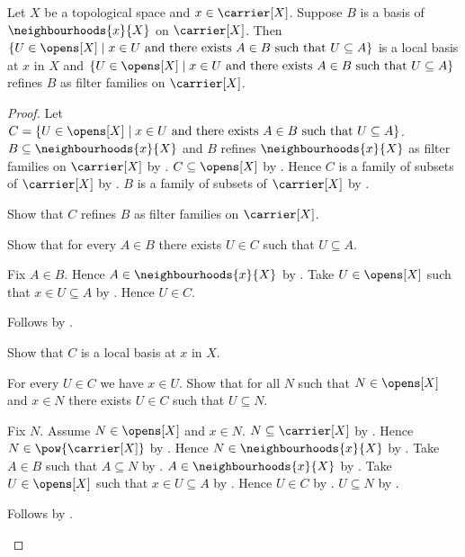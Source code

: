 \begin{theorem}\label{neighbourhood_filter_basis_has_open_local_refinement}
    Let $X$ be a topological space and $x\in\carrier[X]$.
    Suppose $B$ is a basis of $\neighbourhoods{x}{X}$ on $\carrier[X]$.
    Then
        $\{U\in\opens[X]\mid
            \text{$x\in U$ and there exists $A\in B$ such that
                $U\subseteq A$}\}$
            is a local basis at $x$ in $X$ and
        $\{U\in\opens[X]\mid
            \text{$x\in U$ and there exists $A\in B$ such that
                $U\subseteq A$}\}$
            refines $B$ as filter families on $\carrier[X]$.
\end{theorem}
\begin{proof}
    Let $C=\{U\in\opens[X]\mid
        \text{$x\in U$ and there exists $A\in B$ such that
            $U\subseteq A$}\}$.
    $B\subseteq\neighbourhoods{x}{X}$ and
        $B$ refines $\neighbourhoods{x}{X}$
            as filter families on $\carrier[X]$
        by .
    $C\subseteq\opens[X]$ by .
    Hence $C$ is a family of subsets of $\carrier[X]$
        by .
    $B$ is a family of subsets of $\carrier[X]$
        by .

    Show that $C$ refines $B$ as filter families on $\carrier[X]$.
    \begin{subproof}
        Show that for every $A\in B$ there exists $U\in C$ such that
            $U\subseteq A$.
        \begin{subproof}
            Fix $A\in B$.
            Hence $A\in\neighbourhoods{x}{X}$ by .
            Take $U\in\opens[X]$ such that $x\in U\subseteq A$
                by .
            Hence $U\in C$.
        \end{subproof}
        Follows by .
    \end{subproof}

    Show that $C$ is a local basis at $x$ in $X$.
    \begin{subproof}
        For every $U\in C$ we have $x\in U$.
        Show that for all $N$ such that $N\in\opens[X]$ and $x\in N$
            there exists $U\in C$ such that $U\subseteq N$.
        \begin{subproof}
            Fix $N$.
            Assume $N\in\opens[X]$ and $x\in N$.
            $N\subseteq\carrier[X]$ by .
            Hence $N\in\pow{\carrier[X]}$ by .
            Hence $N\in\neighbourhoods{x}{X}$
                by .
            Take $A\in B$ such that $A\subseteq N$
                by .
            $A\in\neighbourhoods{x}{X}$ by .
            Take $U\in\opens[X]$ such that $x\in U\subseteq A$
                by .
            Hence $U\in C$ by \auto.
            $U\subseteq N$ by .
        \end{subproof}
        Follows by .
    \end{subproof}
\end{proof}

